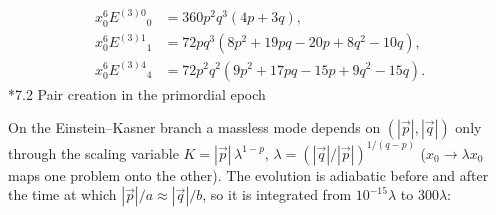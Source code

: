 \documentclass[10pt,a4paper]{article}
\makeatletter
\renewcommand\subsection{\@startsection{subsection}{2}{\z@}{-3.25ex\@plus -1ex \@minus -.2ex}{1.5ex \@plus .2ex}{\normalfont\large\bfseries\raggedright}}
\makeatother
\begin{document}
\begin{align*}
x_0^{6}E^{(3)0}{}_0&=360 p^{2} q^{3} \left(4 p + 3 q\right), \\
x_0^{6}E^{(3)1}{}_1&=72 p q^{3} \left(8 p^{2} + 19 p q - 20 p + 8 q^{2} - 10 q\right), \\
x_0^{6}E^{(3)4}{}_4&=72 p^{2} q^{2} \left(9 p^{2} + 17 p q - 15 p + 9 q^{2} - 15 q\right).
\end{align*}
\subsection*{7.2 Pair creation in the primordial epoch}
On the Einstein–Kasner branch a massless mode depends on $(|\vec p|,|\vec q|)$ only through the scaling variable $K=|\vec p|\,\lambda^{1-p}$, $\lambda=(|\vec q|/|\vec p|)^{1/(q-p)}$ ($x_0\to\lambda x_0$ maps one problem onto the other). The evolution is adiabatic before and after the time at which $|\vec p|/a\approx|\vec q|/b$, so it is integrated from $10^{-15}\lambda$ to $300\lambda$:
\end{document}
